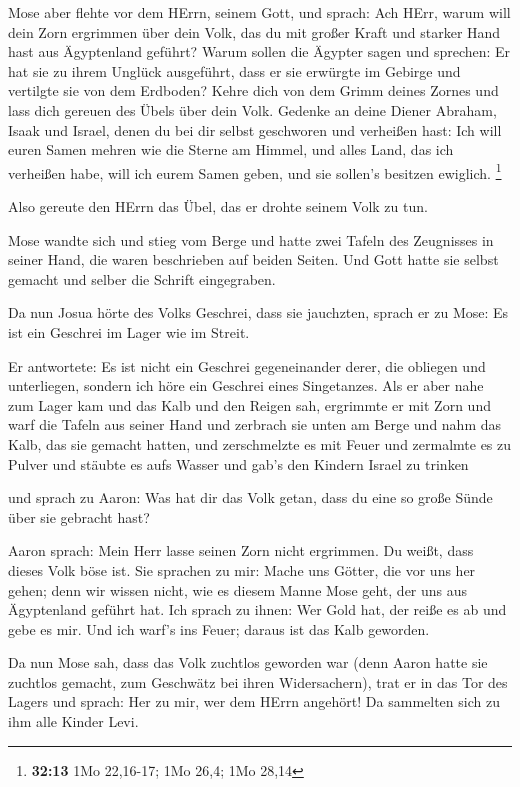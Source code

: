  Mose aber flehte vor dem HErrn, seinem Gott, und sprach:
Ach HErr, warum will dein Zorn ergrimmen über dein Volk, das du mit
großer Kraft und starker Hand hast aus Ägyptenland geführt?
 Warum sollen die Ägypter sagen und sprechen: Er hat sie zu
ihrem Unglück ausgeführt, dass er sie erwürgte im Gebirge und vertilgte
sie von dem Erdboden? Kehre dich von dem Grimm deines Zornes und lass
dich gereuen des Übels über dein Volk.  Gedenke an deine
Diener Abraham, Isaak und Israel, denen du bei dir selbst geschworen und
verheißen hast: Ich will euren Samen mehren wie die Sterne am Himmel,
und alles Land, das ich verheißen habe, will ich eurem Samen geben, und
sie sollen's besitzen ewiglich. \footnote{\textbf{32:13} 1Mo 22,16-17;
  1Mo 26,4; 1Mo 28,14}

 Also gereute den HErrn das Übel, das er drohte seinem Volk
zu tun.

 Mose wandte sich und stieg vom Berge und hatte zwei Tafeln
des Zeugnisses in seiner Hand, die waren beschrieben auf beiden Seiten.
 Und Gott hatte sie selbst gemacht und selber die Schrift
eingegraben.

 Da nun Josua hörte des Volks Geschrei, dass sie jauchzten,
sprach er zu Mose: Es ist ein Geschrei im Lager wie im Streit.

 Er antwortete: Es ist nicht ein Geschrei gegeneinander
derer, die obliegen und unterliegen, sondern ich höre ein Geschrei eines
Singetanzes.  Als er aber nahe zum Lager kam und das Kalb
und den Reigen sah, ergrimmte er mit Zorn und warf die Tafeln aus seiner
Hand und zerbrach sie unten am Berge  und nahm das Kalb,
das sie gemacht hatten, und zerschmelzte es mit Feuer und zermalmte es
zu Pulver und stäubte es aufs Wasser und gab's den Kindern Israel zu
trinken

 und sprach zu Aaron: Was hat dir das Volk getan, dass du
eine so große Sünde über sie gebracht hast?

 Aaron sprach: Mein Herr lasse seinen Zorn nicht ergrimmen.
Du weißt, dass dieses Volk böse ist.  Sie sprachen zu mir:
Mache uns Götter, die vor uns her gehen; denn wir wissen nicht, wie es
diesem Manne Mose geht, der uns aus Ägyptenland geführt hat.
 Ich sprach zu ihnen: Wer Gold hat, der reiße es ab und
gebe es mir. Und ich warf's ins Feuer; daraus ist das Kalb geworden.

 Da nun Mose sah, dass das Volk zuchtlos geworden war (denn
Aaron hatte sie zuchtlos gemacht, zum Geschwätz bei ihren Widersachern),
 trat er in das Tor des Lagers und sprach: Her zu mir, wer
dem HErrn angehört! Da sammelten sich zu ihm alle Kinder Levi.

